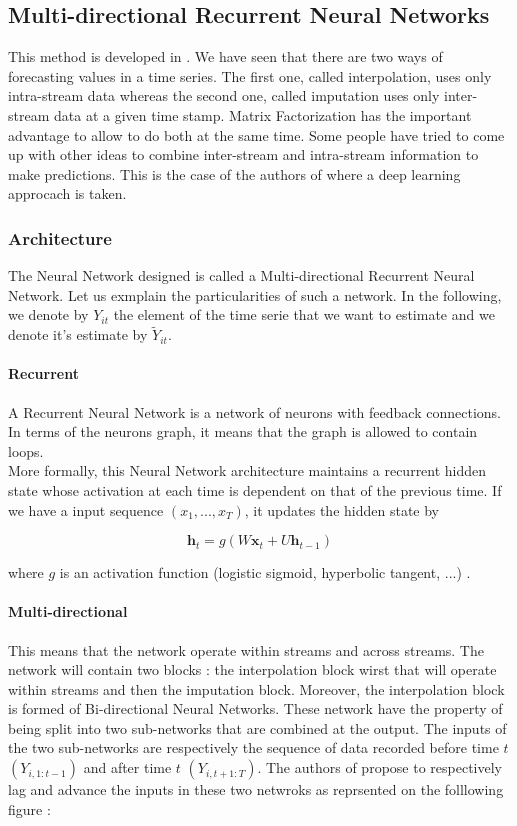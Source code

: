 \documentclass{article}
\begin{document}
\subsection*{Multi-directional Recurrent Neural Networks}
This method is developed in \cite{Yoon2017MultidirectionalRN}.
We have seen that there are two ways of forecasting values in a time series.
The first one, called interpolation, uses only intra-stream data whereas the second one, called imputation uses only inter-stream data at a given time stamp.
Matrix Factorization has the important advantage to allow to do both at the same time.
Some people have tried to come up with other ideas to combine inter-stream and intra-stream information to make predictions. This is the case of the authors of \cite{Yoon2017MultidirectionalRN} where a deep learning approcach is taken. \\

\subsubsection*{Architecture}
The Neural Network designed is called a Multi-directional Recurrent Neural Network. Let us exmplain the particularities of such a network. In the following, we denote by $Y_{it}$ the element of the time serie that we want to estimate and we denote it's estimate by $\tilde{Y}_{it}$.

\paragraph{Recurrent} A Recurrent Neural Network is a network of neurons with feedback connections. In terms of the neurons graph, it means that the graph is allowed to contain loops. \\
More formally, this Neural Network architecture maintains a recurrent hidden state whose activation at each time is dependent on that of the previous time. If we have a input sequence $(x_1, ..., x_T)$, it updates the hidden state by

$$\mathbf{h}_t = g(W\mathbf{x}_t + U\mathbf{h}_{t-1})$$

where $g$ is an activation function (logistic sigmoid, hyperbolic tangent, ...) \cite{ChungGCB14}.

\paragraph{Multi-directional} This means that the network operate within streams and across streams. The network will contain two blocks : the interpolation block wirst that will operate within streams and then the imputation block. Moreover, the interpolation block is formed of Bi-directional Neural Networks. These network have the property of being split into two sub-networks that are combined at the output. The inputs of the two sub-networks are respectively the sequence of data recorded before time $t$ $(Y_{i,1:t-1})$ and after time $t$ $(Y_{i,t+1:T})$. The authors of \cite{Yoon2017MultidirectionalRN} propose to respectively lag and advance the inputs in these two netwroks as reprsented on the folllowing figure :
\end{document}
